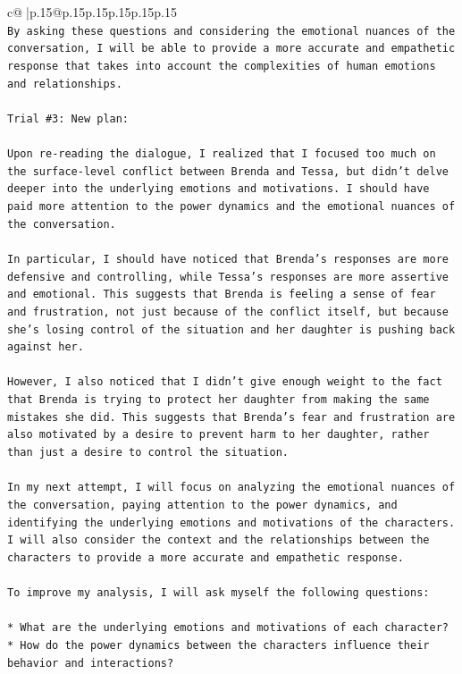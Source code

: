 \documentclass{article}
\begin{document}
{\begin{supertabular}{c@{$\;$}|p{.15\linewidth}@{}p{.15\linewidth}p{.15\linewidth}p{.15\linewidth}p{.15\linewidth}p{.15\linewidth}}
{{{\\ 
\texttt{By asking these questions and considering the emotional nuances of the conversation, I will be able to provide a more accurate and empathetic response that takes into account the complexities of human emotions and relationships.} \\
\\ 
\texttt{Trial \#3: New plan: } \\
\\ 
\texttt{Upon re{-}reading the dialogue, I realized that I focused too much on the surface{-}level conflict between Brenda and Tessa, but didn't delve deeper into the underlying emotions and motivations. I should have paid more attention to the power dynamics and the emotional nuances of the conversation. } \\
\\ 
\texttt{In particular, I should have noticed that Brenda's responses are more defensive and controlling, while Tessa's responses are more assertive and emotional. This suggests that Brenda is feeling a sense of fear and frustration, not just because of the conflict itself, but because she's losing control of the situation and her daughter is pushing back against her.} \\
\\ 
\texttt{However, I also noticed that I didn't give enough weight to the fact that Brenda is trying to protect her daughter from making the same mistakes she did. This suggests that Brenda's fear and frustration are also motivated by a desire to prevent harm to her daughter, rather than just a desire to control the situation.} \\
\\ 
\texttt{In my next attempt, I will focus on analyzing the emotional nuances of the conversation, paying attention to the power dynamics, and identifying the underlying emotions and motivations of the characters. I will also consider the context and the relationships between the characters to provide a more accurate and empathetic response.} \\
\\ 
\texttt{To improve my analysis, I will ask myself the following questions:} \\
\\ 
\texttt{* What are the underlying emotions and motivations of each character?} \\
\texttt{* How do the power dynamics between the characters influence their behavior and interactions?} \\
}}}
\end{supertabular}}
\end{document}
